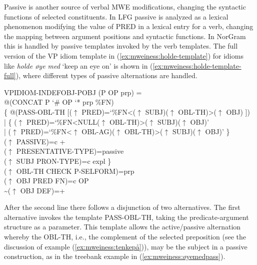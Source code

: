 \documentclass[output=paper]{langsci/langscibook}
\begin{document}
Passive is another source of verbal MWE modifications, changing the syntactic functions of selected constituents.
In LFG passive is analyzed as a lexical phenomenon modifying the value of PRED in a lexical entry for a verb, changing the mapping between argument positions and syntactic functions.
In NorGram this is handled by passive templates invoked by the verb templates.
The full version of the VP idiom template in (\ref{ex:mweiness:holde-template}) for idioms like \textit{holde øye med} `keep an eye on' is shown in (\ref{ex:mweiness:holde-template-full}), where different types of passive alternations are handled.

\clearpage

\ea\label{ex:mweiness:holde-template-full}
{\small 
 VPIDIOM-INDEFOBJ-POBJ (P OP prp) =\\%
\hspace{1.5em} @(CONCAT P `\# OP `* prp \%FN)\\%
\hspace{1.5em}  \{ \enspace @(PASS-OBL-TH [($\uparrow$  PRED)=`\%FN<($\uparrow$ SUBJ)($\uparrow$ OBL-TH)>($\uparrow$ OBJ) ])\\%
\hspace{1.5em} | \enspace \{ \enspace ($\uparrow$  PRED)=`\%FN<NULL($\uparrow$ OBL-TH)>($\uparrow$ SUBJ)($\uparrow$ OBJ)'\\%
\hspace{1.5em} \quad | \enspace ($\uparrow$  PRED)=`\%FN<$\uparrow$ OBL-AG)($\uparrow$  OBL-TH)>($\uparrow$ SUBJ)($\uparrow$ OBJ)' \enspace \}\\%
\hspace{1.5em} \quad ($\uparrow$ PASSIVE)=c +\\%
\hspace{1.5em} \quad ($\uparrow$ PRESENTATIVE-TYPE)=passive\\%
\hspace{1.5em} \quad ($\uparrow$ SUBJ PRON-TYPE)=c expl \enspace \}\\%
\hspace{1.5em} ($\uparrow$ OBL-TH CHECK P-SELFORM)=prp\\%
\hspace{1.5em} ($\uparrow$ OBJ PRED FN)=c OP\\%
\hspace{1.5em} {\textasciitilde}($\uparrow$ OBJ DEF)=+
}
\z

After the second line there follows a disjunction of two alternatives.
The first alternative invokes the template PASS-OBL-TH, taking the predicate-argument structure as a parameter.
This template allows the active/passive alternation whereby the OBL-TH, i.e., the complement of the selected preposition (see the discussion of example (\ref{ex:mweiness:tenkepå})), may be the subject in a passive construction, as in the treebank example in (\ref{ex:mweiness:øyemedpass}).
\end{document}
